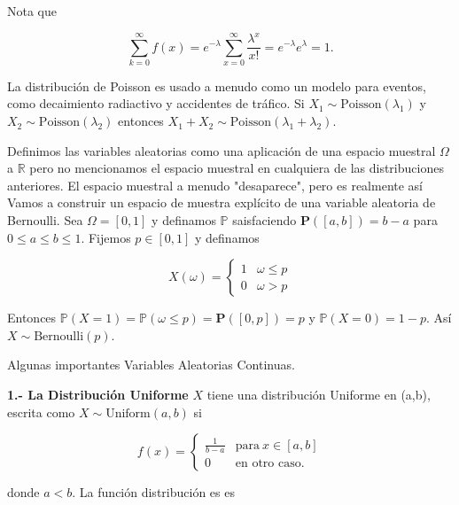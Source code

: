 \documentclass{article}\usepackage[]{graphicx}\usepackage[]{color}
\begin{document}
Nota que

\[
\sum_{k = 0}^{\infty}f(x) = e^{-\lambda}\sum_{x = 0}^{\infty}\frac{\lambda^{x}}{x!} = e^{-\lambda}e^{\lambda} = 1. 
\]

\vspace{0.5cm}

La distribuci\'on de Poisson es usado a menudo como un modelo para eventos, como decaimiento radiactivo y accidentes de tr\'afico. Si $X_1\sim \mbox{Poisson}(\lambda_1)$ y  $X_2 \sim \mbox{Poisson}(\lambda_2)$ entonces $X_1 + X_2 \sim \mbox{Poisson}(\lambda_1 + \lambda_2)$.

\vspace{0.3cm}

Definimos las variables aleatorias como una aplicaci\'on de una espacio muestral $\Omega$ a $\mathbb{R}$ pero no mencionamos el espacio muestral en cualquiera de las distribuciones anteriores. El espacio muestral a menudo "desaparece", pero es realmente as\'i Vamos a construir un espacio de muestra expl\'icito de una variable aleatoria de Bernoulli. Sea $\Omega = [0,1]$ y definamos $\mathbb{P}$ saisfaciendo $\mathbf{P}([a, b]) = b -a$ para $0 \leq a \leq b \leq 1$. Fijemos $p \in [ 0,1]$ y definamos

\[
X(\omega) = \begin{cases}
1 & \omega \leq p\\
0 & \omega > p
\end{cases}
\]

\vspace{0.3cm}

Entonces $\mathbb{P}(X = 1) = \mathbb{P}(\omega \leq p) = \mathbf{P}([0, p]) = p$ y $\mathbb{P}(X = 0) = 1 -p$. As\'i $X \sim \mbox{Bernoulli}(p)$.


\vspace{0.8cm}


{\Large Algunas importantes Variables Aleatorias Continuas.}

\vspace{0.8cm}

\textbf{1.- La Distribuci\'on Uniforme} $X$ tiene una distribuci\'on Uniforme en (a,b), escrita como $X \sim \mbox{Uniform}(a,b)$ si

\[
f(x) = \begin{cases}
\frac{1}{b -a} & \mbox{para}\ x\in [a,b]\\
0 & \mbox{en otro caso}.
\end{cases}
\]
\vspace{0.2cm}

donde $a < b$. La funci\'on distribuci\'on es es
\end{document}
